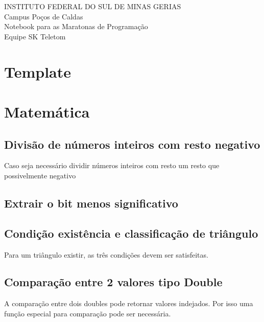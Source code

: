 \documentclass[a4paper,12pt]{article}
\begin{document}
\begin{center}
\Large{INSTITUTO FEDERAL DO SUL DE MINAS GERIAS}\\
\large{Campus Poços de Caldas}\\
\vspace{10cm}
\Large{Notebook para as Maratonas de Programação}\\
\large{Equipe SK Teletom}
\end{center}

\newpage
\tableofcontents
\thispagestyle{empty}

\newpage
\section{Template}

\newpage
\section{Matemática}
\subsection{Divisão de números inteiros com resto negativo}

Caso seja necessário dividir números inteiros com resto um resto que possivelmente negativo

\subsection{Extrair o bit menos significativo}


\subsection{Condição existência e classificação de triângulo}

Para um triângulo existir, as três condições devem ser satisfeitas.


\subsection{Comparação entre 2 valores tipo Double}

A comparação entre dois doubles pode retornar valores indejados. Por isso uma função especial para comparação pode ser necessária.

\end{document}
